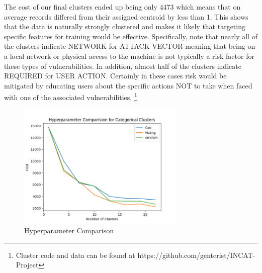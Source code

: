 \documentclass{article} %
\begin{document}
The cost of our final clusters ended up being only 4473 which means that on average records differed from their assigned centroid by less than 1.  This shows that the data is naturally strongly clustered and makes it likely that targeting specific features for training would be effective.  Specifically, note that nearly all of the clusters indicate NETWORK for ATTACK VECTOR meaning that being on a local network or physical access to the machine is not typically a risk factor for these types of vulnerabilities.  In addition, almost half of the clusters indicate REQUIRED for USER ACTION.  Certainly in these cases risk would be mitigated by educating users about the specific actions NOT to take when faced with one of the associated vulnerabilities. \footnote{Cluster code and data can be found at https://github.com/genterist/INCAT-Project}

\begin{figure}[ht]
  \centering
  \includegraphics[width=8cm]{images/Hyperparameter.png}
  \caption{Hyperparameter Comparison}
\end{figure}
\end{document}
